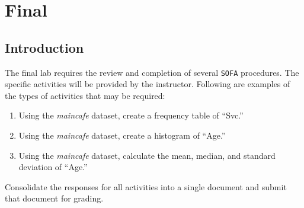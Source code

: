\chapter{Final}\label{fin:final}
\section{Introduction}

The final lab requires the review and completion of several \texttt{SOFA} procedures. The specific activities will be provided by the instructor. Following are examples of the types of activities that may be required:

\begin{enumerate}
  \item Using the \textit{maincafe} dataset, create a frequency table of ``Svc.''
  \item Using the \textit{maincafe} dataset, create a histogram of ``Age.''
  \item Using the \textit{maincafe} dataset, calculate the mean, median, and standard deviation of ``Age.''
\end{enumerate}

Consolidate the responses for all activities into a single document and submit that document for grading.